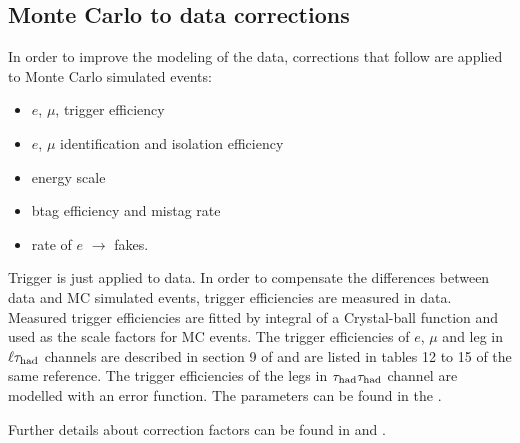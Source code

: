 \subsection{Monte Carlo to data corrections}
\label{sec:scaleFactors}
In order to improve the modeling of the data, corrections that follow are
 applied  to Monte Carlo simulated events:
\begin{itemize}
\item $e$, $\mu$, \Tau trigger efficiency
\item $e$, $\mu$ identification and isolation efficiency
\item \Tau energy scale
\item btag efficiency and mistag rate
\item rate of $e$ $\rightarrow$ \Tau  fakes.
\end{itemize}

Trigger is just applied to data. In order to compensate the differences between data and MC simulated events, 
trigger efficiencies are measured in data. Measured trigger efficiencies are fitted by integral of a Crystal-ball function and used as
the scale factors for MC events. 
The trigger efficiencies of $e$, $\mu$ and \Tau leg in $\ell\tau_{\rm had}$ channels are described in section 9 of \cite{CMS_AN_2013-171}  and are listed in 
tables 12 to 15 of the same reference. The trigger efficiencies of the \Tau legs in $\tau_{\rm had}\tau_{\rm had}$ channel are modelled with an error function. 
The parameters can be found in the \cite{HiggsTauTautwiki}.
 
Further details about correction factors can be found  in   \cite{HiggsTauTautwiki} and  \cite{CMS_AN_2013-171}.


 
